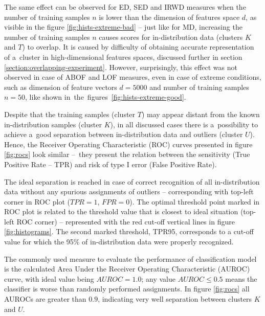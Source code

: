 The same effect can be observed for ED, SED and IRWD measures when the number of training samples $n$ is lower than the dimension of features space $d$, as visible in the figure \ref{fig:hists-extreme-bad} – just like for MD, increasing the number of training samples $n$ causes scores for in-distribution data (clusters $K$ and $T$) to overlap. It is caused by difficulty of obtaining accurate representation of a~cluster in high-dimensional features spaces, discussed further in section \ref{section:overlapping-experiment}. However, surprisingly, this effect was not observed in case of ABOF and LOF measures, even in case of extreme conditions, such as dimension of feature vectors $d = 5000$ and number of training samples $n = 50$, like shown in~the~figures~\ref{fig:hists-extreme-good}.

Despite that the training samples (cluster $T$) may appear distant from the known in-distribution samples (cluster $K$), in all discussed cases there is a~possibility to achieve a~good separation between in-distribution data and outliers (cluster $U$). Hence, the Receiver Operating Characteristic (ROC) curves presented in figure \ref{fig:rocs} look similar –~they present the relation between the sensitivity (True Positive Rate – TPR) and risk of type I error (False Positive Rate).

The ideal separation is reached in case of correct recognition of all in-distribution data without any spurious assignments of outliers – corresponding with top-left corner in ROC plot ($TPR = 1$, $FPR = 0$). The optimal threshold point marked in ROC plot is related to the threshold value that is closest to ideal situation (top-left ROC corner) – represented with the red cut-off vertical lines in figure \ref{fig:histograms}. The second marked threshold, TPR95, corresponds to a cut-off value for which the 95\% of in-distribution data were properly recognized.

The commonly used measure to evaluate the performance of classification model is the calculated Area Under the Receiver Operating Characteristic (AUROC) curve, with ideal value being $AUROC = 1.0$; any value $AUROC \leq 0.5$ means the classifier is worse than randomly performed assignments. In figure \ref{fig:rocs} all AUROCs are greater than $0.9$, indicating very well separation between clusters $K$ and $U$.

